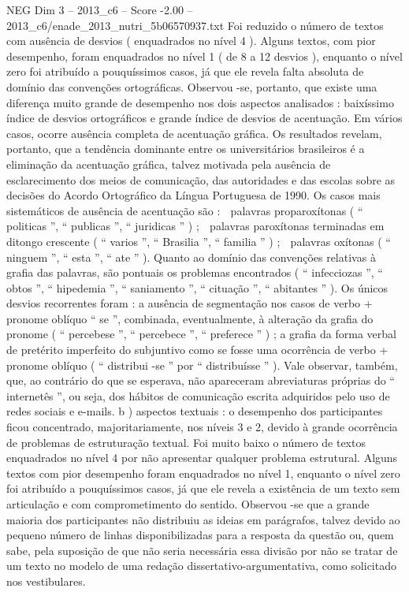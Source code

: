 \begin{textsample}{NEG Dim 3 – 2013\_c6 – Score -2.00 – 2013\_c6/enade\_2013\_nutri\_5b06570937.txt}
Foi reduzido o número de textos com ausência de desvios ( enquadrados no nível 4 ).
Alguns textos, com pior desempenho, foram enquadrados no nível 1 ( de 8 a 12 desvios ), enquanto o nível zero foi atribuído a pouquíssimos casos, já que ele revela falta absoluta de domínio das convenções ortográficas.
Observou -se, portanto, que existe uma diferença muito grande de desempenho nos dois aspectos analisados : baixíssimo índice de desvios ortográficos e grande índice de desvios de acentuação.
Em vários casos, ocorre ausência completa de acentuação gráfica.
Os resultados revelam, portanto, que a tendência dominante entre os universitários brasileiros é a eliminação da acentuação gráfica, talvez motivada pela ausência de esclarecimento dos meios de comunicação, das autoridades e das escolas sobre as decisões do Acordo Ortográfico da Língua Portuguesa de 1990.
Os casos mais sistemáticos de ausência de acentuação são :  palavras proparoxítonas ( “ politicas ”, “ publicas ”, “ juridicas ” ) ;  palavras paroxítonas terminadas em ditongo crescente ( “ varios ”, “ Brasilia ”, “ familia ” ) ;  palavras oxítonas ( “ ninguem ”, “ esta ”, “ ate ” ).
Quanto ao domínio das convenções relativas à grafia das palavras, são pontuais os problemas encontrados ( “ infecciozas ”, “ obtos ”, “ hipedemia ”, “ saniamento ”, “ cituação ”, “ abitantes ” ).
Os únicos desvios recorrentes foram : a ausência de segmentação nos casos de verbo + pronome oblíquo “ se ”, combinada, eventualmente, à alteração da grafia do pronome ( “ percebese ”, “ percebece ”, “ preferece ” ) ; a grafia da forma verbal de pretérito imperfeito do subjuntivo como se fosse uma ocorrência de verbo + pronome oblíquo ( “ distribui -se ” por “ distribuísse ” ).
Vale observar, também, que, ao contrário do que se esperava, não apareceram abreviaturas próprias do “ internetês ”, ou seja, dos hábitos de comunicação escrita adquiridos pelo uso de redes sociais e e-mails. b ) aspectos textuais : o desempenho dos participantes ficou concentrado, majoritariamente, nos níveis 3 e 2, devido à grande ocorrência de problemas de estruturação textual.
Foi muito baixo o número de textos enquadrados no nível 4 por não apresentar qualquer problema estrutural.
Alguns textos com pior desempenho foram enquadrados no nível 1, enquanto o nível zero foi atribuído a pouquíssimos casos, já que ele revela a existência de um texto sem articulação e com comprometimento do sentido.
Observou -se que a grande maioria dos participantes não distribuiu as ideias em parágrafos, talvez devido ao pequeno número de linhas disponibilizadas para a resposta da questão ou, quem sabe, pela suposição de que não seria necessária essa divisão por não se tratar de um texto no modelo de uma redação dissertativo-argumentativa, como solicitado nos vestibulares.

\end{textsample}
